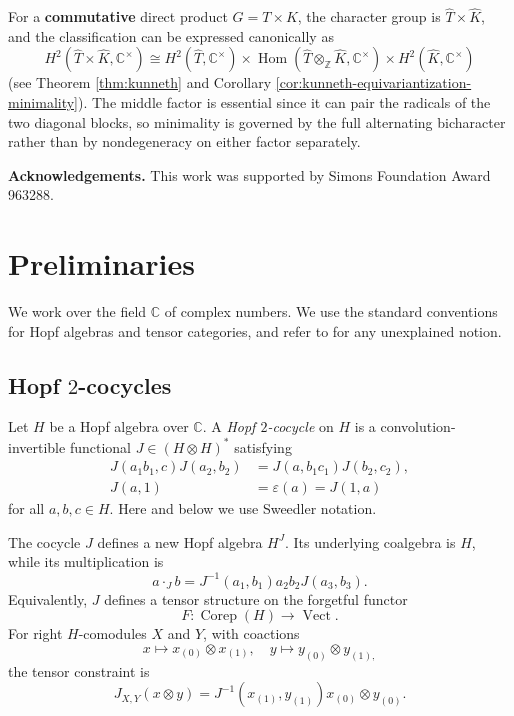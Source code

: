 \documentclass{amsart}
\theoremstyle{definition}
\newcommand{\Hom}{\operatorname{Hom}}
\newcommand{\Corep}{\operatorname{Corep}}
\newcommand{\Vect}{\operatorname{Vect}}
\newcommand{\Ctimes}{\mathbb{C}^{\times}}
\numberwithin{equation}{section}
\begin{document}
For a {\bf commutative} direct product $G=T\times K$, the character group is
$\widehat T\times\widehat K$, and the classification can be expressed canonically
as
\[
 H^2(\widehat T\times\widehat K,\Ctimes)
 \cong
 H^2(\widehat T,\Ctimes)
 \times \Hom(\widehat T\otimes_{\mathbb Z}\widehat K,\Ctimes)
 \times H^2(\widehat K,\Ctimes)
\]
(see Theorem \ref{thm:kunneth} and Corollary 
\ref{cor:kunneth-equivariantization-minimality}). The middle factor is essential since it can pair the radicals of the two diagonal
blocks, so minimality is governed by the full alternating bicharacter rather than
by nondegeneracy on either factor separately.

\medskip
\noindent
\textbf{Acknowledgements.}
This work was supported by Simons Foundation Award 963288.

\section{Preliminaries}\label{sec:preliminaries}

We work over the field $\mathbb{C}$ of complex numbers. We use the standard conventions for Hopf algebras and tensor categories, and refer to \cite{A,EGNO,M,S} for any unexplained notion.

\subsection{\texorpdfstring{Hopf $2$-cocycles}{Hopf 2-cocycles}}\label{sec:hopf-cocycles}

Let $H$ be a Hopf algebra over $\mathbb{C}$.  A \emph{Hopf $2$-cocycle} on $H$ is
a convolution-invertible functional $J\in(H\otimes H)^*$ satisfying
\begin{align*}
 J(a_1b_1,c)J(a_2,b_2)&=J(a,b_1c_1)J(b_2,c_2),\\
 J(a,1)&=\varepsilon(a)=J(1,a)
\end{align*}
for all $a,b,c\in H$.  Here and below we use Sweedler notation.

The cocycle $J$ defines a new Hopf algebra $H^J$.  Its underlying coalgebra is $H$, while its
multiplication is
\[
 a\cdot_J b=J^{-1}(a_1,b_1)a_2b_2J(a_3,b_3).
\]
Equivalently, $J$ defines a tensor structure on the forgetful functor
$$F:\Corep(H)\to\Vect.$$
For right $H$-comodules $X$ and $Y$, with coactions
$$x\mapsto x_{(0)}\otimes x_{(1)},\quad y\mapsto y_{(0)}\otimes y_{(1),}$$ 
the tensor constraint is
\[
 J_{X,Y}(x\otimes y)
 =J^{-1}(x_{(1)},y_{(1)})x_{(0)}\otimes y_{(0)}.
\]
\end{document}
